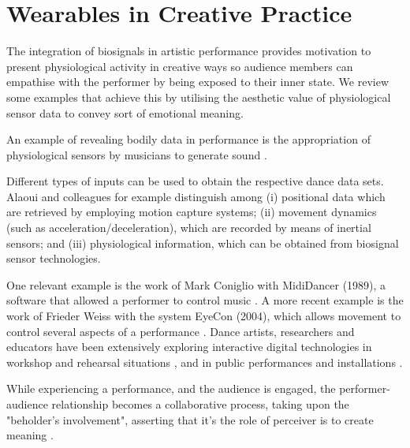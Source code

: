 \section{Wearables in Creative Practice}
\label{lit_review:biosignals_creativity}

The integration of biosignals in artistic performance provides motivation to present physiological activity in creative ways so audience members can empathise with the performer by being exposed to their inner state. We review some examples that achieve this by utilising the aesthetic value of physiological sensor data to convey sort of emotional meaning.

An example of revealing bodily data in performance is the appropriation of physiological sensors by musicians to generate sound \cite{aly_appropriating_2021}.

Different types of inputs can be used to obtain the respective dance data sets. Alaoui and colleagues \cite{fdili2017seeing} for example distinguish among (i) positional data which are retrieved by employing motion capture systems; (ii) movement dynamics (such as acceleration/deceleration), which are recorded by means of inertial sensors; and (iii) physiological information, which can be obtained from biosignal sensor technologies.

One relevant example is the work of Mark Coniglio with MidiDancer (1989), a software that allowed a performer to control music \cite{Troikaranch}. A more recent example is the work of Frieder Weiss with the system EyeCon (2004), which allows movement to control several aspects of a performance \cite{wechsler2004eyecon}. Dance artists, researchers and educators have been extensively exploring interactive digital technologies in workshop and rehearsal situations \cite{dinkla2002dance}, and in public performances and installations \cite{latulipe2010exploring}.

While experiencing a performance, and the audience is engaged, the performer-audience relationship becomes a collaborative process, taking upon the "beholder's involvement", asserting that it's the role of perceiver is to create meaning \cite{kandel_age_2012}.

\cite{francoise_designing_2017}

\cite{giomi_somatic_2020}

